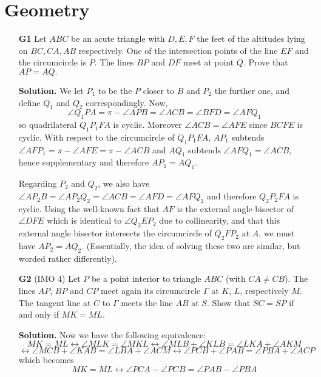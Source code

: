 \documentclass[11pt]{article}
\newcommand{\lra}{\leftrightarrow}
\newcommand{\<}{\langle}
\renewcommand{\>}{\rangle}
\begin{document}
\section*{Geometry}
\begin{enumerate}
	\item [\textbf{G1}] Let $ABC$ be an acute triangle with $D, E, F$ the feet of the altitudes lying on $BC, CA, AB$ respectively. One of the intersection points of the line $EF$ and the circumcircle is $P.$ The lines $BP$ and $DF$ meet at point $Q.$ Prove that $AP = AQ.$
	
	\textbf{Solution.} We let $P_1$ to be the $P$ closer to $B$ and $P_2$ the further one, and define $Q_1$ and $Q_2$ correspondingly. Now, 
	\[\angle Q_1PA=\pi - \angle APB = \angle ACB = \angle BFD = \angle AFQ_1
	\]
	so quadrilateral $Q_1P_1FA$ is cyclic. Moreover $\angle ACB = \angle AFE$ since $BCFE$ is cyclic. With respect to the circumcircle of $Q_1P_1FA$, $AP_1$ subtends $\angle AFP_1=\pi - \angle AFE=\pi-\angle ACB$ and $AQ_1$ subtends $\angle AFQ_1=\angle ACB$, hence supplementary and therefore $AP_1=AQ_1$. 
	
	Regarding $P_2$ and $Q_2$, we also have 
	$\angle AP_2B=\angle AP_2Q_2=\angle ACB =\angle AFD=\angle AFQ_2$ and therefore $Q_2P_2FA$ is cyclic. Using the well-known fact that $AF$ is the external angle bisector of $\angle DFE$ which is identical to $\angle Q_2EP_2$ due to collinearity, and that this external angle bisector intersects the circumcircle of $Q_2FP_2$ at $A$, we must have $AP_2=AQ_2$. (Essentially, the idea of solving these two are similar, but worded rather differently). 
	
	\item [\textbf{G2}] (IMO 4) Let $P$ be a point interior to triangle $ABC$ (with $CA \neq CB$). The lines $AP$, $BP$ and $CP$ meet again its circumcircle $\Gamma$ at $K$, $L$, respectively $M$. The tangent line at $C$ to $\Gamma$ meets the line $AB$ at $S$. Show that $SC = SP$ if and only if $MK = ML$.
	
	\textbf{Solution.} Now we have the following equivalence: 
	\[MK=ML\lra \angle MLK=\angle MKL \lra \angle MLB + \angle KLB = \angle LKA + \angle AKM\]
	\[\lra \angle MCB + \angle KAB = \angle LBA + \angle ACM
	\lra \angle PCB + \angle PAB = \angle PBA + \angle ACP
	\]
	which becomes 
	\begin{equation}
	  MK=ML\lra \angle PCA - \angle PCB  = \angle PAB - \angle PBA
	\end{equation}
	

\end{enumerate}
\end{document}
